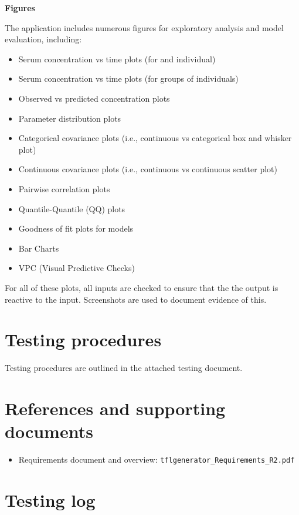 \documentclass{article}
\newcommand{\testinglog}{figures-testing-log.pdf}
\begin{document}
{\bf Figures}

The application includes numerous figures for exploratory analysis and model evaluation, including:

\begin{itemize}
  \item Serum concentration vs time plots (for and individual)
  \item Serum concentration vs time plots (for groups of individuals)
  \item Observed vs predicted concentration plots
  \item Parameter distribution plots
  \item Categorical covariance plots (i.e., continuous vs categorical box and whisker plot)
  \item Continuous covariance plots (i.e., continuous vs continuous scatter plot)
  \item Pairwise correlation plots
  \item Quantile-Quantile (QQ) plots
  \item Goodness of fit plots for models
  \item Bar Charts
  \item VPC (Visual Predictive Checks)
\end{itemize}

For all of these plots, all inputs are checked to ensure that the the output is reactive to the input.  Screenshots are used to document evidence of this.

\section*{Testing procedures}

Testing procedures are outlined in the attached testing document.


\section*{References and supporting documents}

\begin{itemize}
 \item Requirements document and overview: \verb=tflgenerator_Requirements_R2.pdf=
\end{itemize}

\section*{Testing log}


\end{document}
